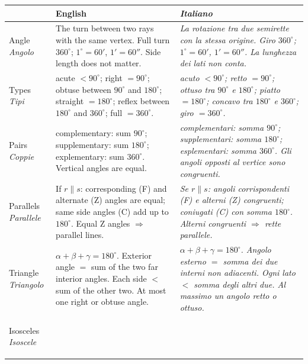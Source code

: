 \documentclass[10pt,a4paper,oneside]{book}
\begin{document}
{\small
\renewcommand{\arraystretch}{1.28}
\begin{tabularx}{\textwidth}{@{}>{\bfseries\color{navy}\raggedright\arraybackslash}p{2.1cm} >{\raggedright\arraybackslash}X >{\raggedright\arraybackslash\itshape\leavevmode\color{itgreen}}X@{}}
\toprule
\rowcolor{white}
& \textbf{English} & \textbf{\upshape Italiano}\\
\midrule
Angle \newline \textit{Angolo} &
The turn between two rays with the same vertex. Full turn $360^\circ$; $1^\circ = 60'$, $1' = 60''$. Side length does not matter. &
La rotazione tra due semirette con la stessa origine. Giro $360^\circ$; $1^\circ = 60'$, $1' = 60''$. La lunghezza dei lati non conta.\\
Types \newline \textit{Tipi} &
acute $<90^\circ$; right $=90^\circ$; obtuse between $90^\circ$ and $180^\circ$; straight $=180^\circ$; reflex between $180^\circ$ and $360^\circ$; full $=360^\circ$. &
acuto $<90^\circ$; retto $=90^\circ$; ottuso tra $90^\circ$ e $180^\circ$; piatto $=180^\circ$; concavo tra $180^\circ$ e $360^\circ$; giro $=360^\circ$.\\
Pairs \newline \textit{Coppie} &
complementary: sum $90^\circ$; supplementary: sum $180^\circ$; explementary: sum $360^\circ$. Vertical angles are equal. &
complementari: somma $90^\circ$; supplementari: somma $180^\circ$; esplementari: somma $360^\circ$. Gli angoli opposti al vertice sono congruenti.\\
Parallels \newline \textit{Parallele} &
If $r \parallel s$: corresponding (F) and alternate (Z) angles are equal; same side angles (C) add up to $180^\circ$. Equal Z angles $\Rightarrow$ parallel lines. &
Se $r \parallel s$: angoli corrispondenti (F) e alterni (Z) congruenti; coniugati (C) con somma $180^\circ$. Alterni congruenti $\Rightarrow$ rette parallele.\\
Triangle \newline \textit{Triangolo} &
$\alpha + \beta + \gamma = 180^\circ$. Exterior angle $=$ sum of the two far interior angles. Each side $<$ sum of the other two. At most one right or obtuse angle. &
$\alpha + \beta + \gamma = 180^\circ$. Angolo esterno $=$ somma dei due interni non adiacenti. Ogni lato $<$ somma degli altri due. Al massimo un angolo retto o ottuso.\\
Isosceles \newline \textit{Isoscele} &

\end{tabularx}}
\end{document}
